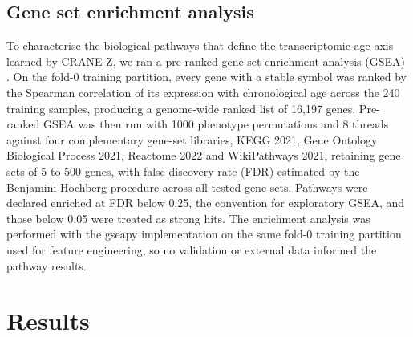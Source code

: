 \documentclass[unnumsec,webpdf,contemporary,large]{oup-authoring-template}
\begin{document}
\subsection{Gene set enrichment analysis}\label{sec:gsea-method}
To characterise the biological pathways that define the transcriptomic age axis learned by CRANE-Z, we ran a pre-ranked gene set enrichment analysis (GSEA) \cite{subramanian2005gsea,mootha2003pgc}. On the fold-0 training partition, every gene with a stable symbol was ranked by the Spearman correlation of its expression with chronological age across the 240 training samples, producing a genome-wide ranked list of 16,197 genes. Pre-ranked GSEA was then run with 1000 phenotype permutations and 8 threads against four complementary gene-set libraries, KEGG 2021, Gene Ontology Biological Process 2021, Reactome 2022 and WikiPathways 2021, retaining gene sets of 5 to 500 genes, with false discovery rate (FDR) estimated by the Benjamini-Hochberg procedure across all tested gene sets. Pathways were declared enriched at FDR below 0.25, the convention for exploratory GSEA, and those below 0.05 were treated as strong hits. The enrichment analysis was performed with the gseapy implementation \cite{fang2023gseapy} on the same fold-0 training partition used for feature engineering, so no validation or external data informed the pathway results.

\section{Results}\label{sec:results}
\end{document}
